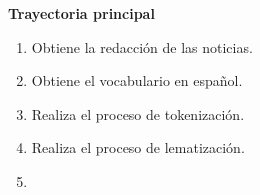 

\begin{large}
	\textbf{Trayectoria principal}\\
\end{large}	

\begin{enumerate}[1.]

	
	\item \sistema Obtiene la redacción de las noticias.

	\item \sistema Obtiene el vocabulario en español.

	\item \sistema Realiza el proceso de tokenización.

	\item \sistema Realiza el proceso de lematización.
	
	\item \finCU	

\end{enumerate}

  